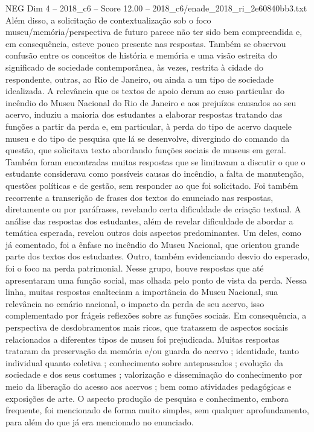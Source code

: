 \begin{textsample}{NEG Dim 4 – 2018\_c6 – Score 12.00 – 2018\_c6/enade\_2018\_ri\_2e60840bb3.txt}
Além disso, a solicitação de contextualização sob o foco museu/memória/perspectiva de futuro parece não ter sido bem compreendida e, em consequência, esteve pouco presente nas respostas.
Também se observou confusão entre os conceitos de história e memória e uma visão estreita do significado de sociedade contemporânea, às vezes, restrita à cidade do respondente, outras, ao Rio de Janeiro, ou ainda a um tipo de sociedade idealizada.
A relevância que os textos de apoio deram ao caso particular do incêndio do Museu Nacional do Rio de Janeiro e aos prejuízos causados ao seu acervo, induziu a maioria dos estudantes a elaborar respostas tratando das funções a partir da perda e, em particular, à perda do tipo de acervo daquele museu e do tipo de pesquisa que lá se desenvolve, divergindo do comando da questão, que solicitava texto abordando funções sociais de museus em geral.
Também foram encontradas muitas respostas que se limitavam a discutir o que o estudante considerava como possíveis causas do incêndio, a falta de manutenção, questões políticas e de gestão, sem responder ao que foi solicitado.
Foi também recorrente a transcrição de frases dos textos do enunciado nas respostas, diretamente ou por paráfrases, revelando certa dificuldade de criação textual.
A análise das respostas dos estudantes, além de revelar dificuldade de abordar a temática esperada, revelou outros dois aspectos predominantes.
Um deles, como já comentado, foi a ênfase no incêndio do Museu Nacional, que orientou grande parte dos textos dos estudantes.
Outro, também evidenciando desvio do esperado, foi o foco na perda patrimonial.
Nesse grupo, houve respostas que até apresentaram uma função social, mas olhada pelo ponto de vista da perda.
Nessa linha, muitas respostas enalteciam a importância do Museu Nacional, sua relevância no cenário nacional, o impacto da perda de seu acervo, isso complementado por frágeis reflexões sobre as funções sociais.
Em consequência, a perspectiva de desdobramentos mais ricos, que tratassem de aspectos sociais relacionados a diferentes tipos de museu foi prejudicada.
Muitas respostas trataram da preservação da memória e/ou guarda do acervo ; identidade, tanto individual quanto coletiva ; conhecimento sobre antepassados ; evolução da sociedade e dos seus costumes ; valorização e disseminação do conhecimento por meio da liberação do acesso aos acervos ; bem como atividades pedagógicas e exposições de arte.
O aspecto produção de pesquisa e conhecimento, embora frequente, foi mencionado de forma muito simples, sem qualquer aprofundamento, para além do que já era mencionado no enunciado.

\end{textsample}
